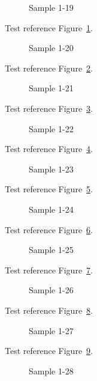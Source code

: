 \begin{figure}[tbhp]
\caption{Sample 1-19}
\label{fig:sample-1-19}
\end{figure}

Test reference Figure~\ref{fig:sample-1-19}.

\begin{figure}[tbhp]
\caption{Sample 1-20}
\label{fig:sample-1-20}
\end{figure}

Test reference Figure~\ref{fig:sample-1-20}.

\begin{figure}[tbhp]
\caption{Sample 1-21}
\label{fig:sample-1-21}
\end{figure}

Test reference Figure~\ref{fig:sample-1-21}.

\begin{figure}[tbhp]
\caption{Sample 1-22}
\label{fig:sample-1-22}
\end{figure}

Test reference Figure~\ref{fig:sample-1-22}.

\begin{figure}[tbhp]
\caption{Sample 1-23}
\label{fig:sample-1-23}
\end{figure}

Test reference Figure~\ref{fig:sample-1-23}.

\begin{figure}[tbhp]
\caption{Sample 1-24}
\label{fig:sample-1-24}
\end{figure}

Test reference Figure~\ref{fig:sample-1-24}.

\begin{figure}[tbhp]
\caption{Sample 1-25}
\label{fig:sample-1-25}
\end{figure}

Test reference Figure~\ref{fig:sample-1-25}.

\begin{figure}[tbhp]
\caption{Sample 1-26}
\label{fig:sample-1-26}
\end{figure}

Test reference Figure~\ref{fig:sample-1-26}.

\begin{figure}[tbhp]
\caption{Sample 1-27}
\label{fig:sample-1-27}
\end{figure}

Test reference Figure~\ref{fig:sample-1-27}.

\begin{figure}[tbhp]
\caption{Sample 1-28}
\label{fig:sample-1-28}
\end{figure}

